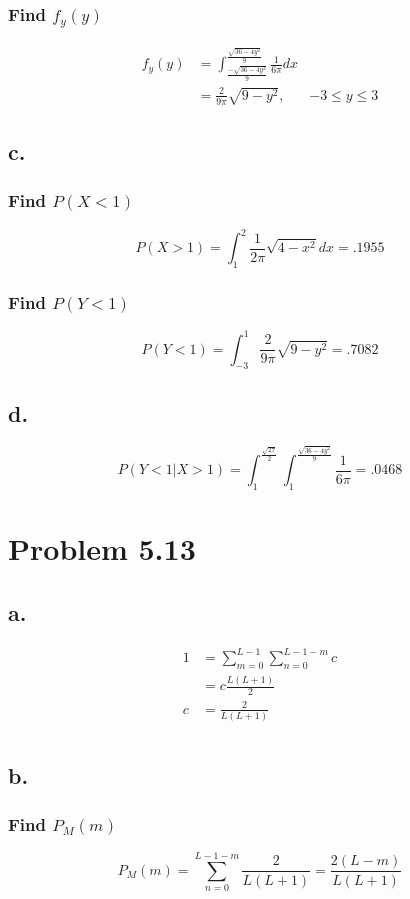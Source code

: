 \documentclass[12pt]{article}
\begin{document}
\subsubsection*{Find $f_y(y)$}
\begin{align*}
  f_y(y) &= \int_{\frac{-\sqrt{36-4y^2}}{9}}^{\frac{\sqrt{36-4y^2}}{9}}\frac{1}{6\pi} dx \\
  &= \frac{2}{9\pi}\sqrt{9-y^2}, & -3 \leq y \leq 3
\end{align*}

\subsection*{c.}
\subsubsection*{Find $P(X<1)$}
\[P(X>1) = \int_1^2 \frac{1}{2\pi} \sqrt{4-x^2}dx = .1955 \]

\subsubsection*{Find $P(Y<1)$}
\[P(Y<1) = \int_{-3}^1 \frac{2}{9\pi}\sqrt{9-y^2} = .7082 \]

\subsection*{d.}
\[P(Y<1|X>1) = \int_1^{\frac{\sqrt{27}}{2}} \int_{1}^{\frac{\sqrt{36-4y^2}}{9}}\frac{1}{6\pi} = .0468 \]

\section*{Problem 5.13}
\subsection*{a.}
\begin{align*}
  1 &= \sum_{m=0}^{L-1} \sum_{n=0}^{L-1-m} c \\
  &= c\frac{L(L+1)}{2} \\
  c &= \frac{2}{L(L+1)} \\
\end{align*}

\subsection*{b.}
\subsubsection*{Find $P_M(m)$}
\[P_M(m) = \sum_{n=0}^{L-1-m}\frac{2}{L(L+1)}  = \frac{2(L-m)}{L(L+1)} \]
\end{document}
